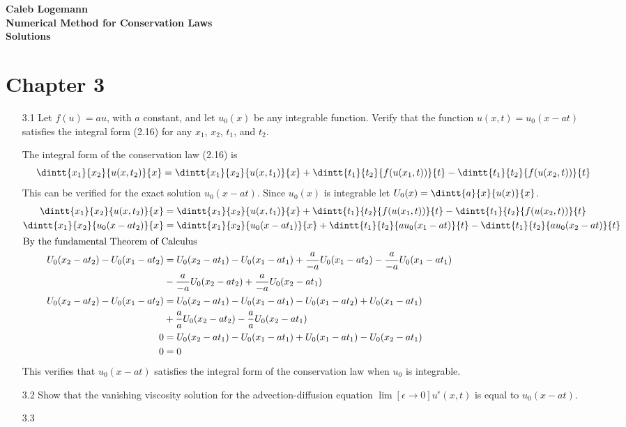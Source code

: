 \documentclass[11pt, oneside]{article}
\begin{document}
\noindent \textbf{\Large{Caleb Logemann \\
Numerical Method for Conservation Laws \\
Solutions
}}

%
\section*{Chapter 3}
\begin{enumerate}
  \item[3.1] %
    Let $f(u) = au$, with $a$ constant, and let $u_0(x)$ be any integrable
    function.
    Verify that the function $u(x, t) = u_0(x - at)$ satisfies the integral
    form (2.16) for any $x_1$, $x_2$, $t_1$, and $t_2$.

    The integral form of the conservation law (2.16) is
    \[
      \dintt{x_1}{x_2}{u(x,t_2)}{x} = \dintt{x_1}{x_2}{u(x,t_1)}{x} 
        + \dintt{t_1}{t_2}{f(u(x_1,t))}{t} - \dintt{t_1}{t_2}{f(u(x_2,t))}{t}
    \]
    This can be verified for the exact solution $u_0(x - at)$.
    Since $u_0(x)$ is integrable let $U_0(x) = \dintt{a}{x}{u(x)}{x}$.
    \begin{align*}
      \dintt{x_1}{x_2}{u(x,t_2)}{x} &= \dintt{x_1}{x_2}{u(x,t_1)}{x} 
        + \dintt{t_1}{t_2}{f(u(x_1,t))}{t} - \dintt{t_1}{t_2}{f(u(x_2,t))}{t} \\
      \dintt{x_1}{x_2}{u_0(x - at_2)}{x} &= \dintt{x_1}{x_2}{u_0(x - at_1)}{x} 
        + \dintt{t_1}{t_2}{au_0(x_1 - at)}{t} - \dintt{t_1}{t_2}{au_0(x_2 - at)}{t} \\
      \intertext{By the fundamental Theorem of Calculus}
      U_0(x_2 - at_2) - U_0(x_1 - at_2) &= U_0(x_2 - at_1) - U_0(x_1 - at_1)
        + \frac{a}{-a} U_0(x_1 - at_2) - \frac{a}{-a}U_0(x_1 - at_1) \\
        &- \frac{a}{-a}U_0(x_2 - at_2) + \frac{a}{-a} U_0(x_2 - at_1) \\
      U_0(x_2 - at_2) - U_0(x_1 - at_2) &= U_0(x_2 - at_1) - U_0(x_1 - at_1)
        - U_0(x_1 - at_2) + U_0(x_1 - at_1) \\
        &+ \frac{a}{a}U_0(x_2 - at_2) - \frac{a}{a} U_0(x_2 - at_1) \\
       0 &= U_0(x_2 - at_1) - U_0(x_1 - at_1) + U_0(x_1 - at_1) - U_0(x_2 - at_1) \\
       0 &= 0
    \end{align*}
    This verifies that $u_0(x - at)$ satisfies the integral form of the
    conservation law when $u_0$ is integrable.

  \item[3.2]
    Show that the vanishing viscosity solution for the advection-diffusion
    equation $\lim[\epsilon \to 0]{u^{\epsilon}(x, t)}$ is equal to
    $u_0(x - at)$.

  \item[3.3]



\end{enumerate}
\end{document}
